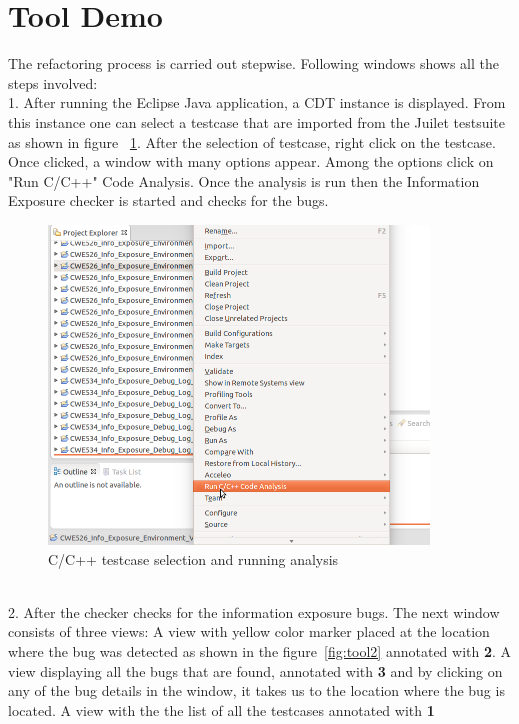 \section{Tool Demo}
\label{demo:behavior}
The refactoring process is carried out stepwise. Following windows shows all the steps involved:\\
1. After running the Eclipse Java application, a CDT instance is displayed. From this
instance one can select a testcase that are imported from the Juilet testsuite as shown in figure
~\ref{fig:tool1}.
After the selection of testcase, right click on the testcase. Once clicked,
a window with many options appear. Among the options click on "Run C/C++" Code Analysis.
Once the analysis is run then the Information Exposure checker is started and checks for
the bugs.\\
\begin{figure}[!htb]
\centering
\includegraphics[width=0.9\textwidth]{png/Tool1.png}
\caption{C/C++ testcase selection and running analysis}
\label{fig:tool1}
\end{figure}\\
2. After the checker checks for the information exposure bugs. The next window consists of three views: A view
with yellow color
marker placed at the location where the bug was detected as shown in the figure~\ref{fig:tool2} annotated 
with \textbf{2}. A view displaying all the bugs that are found, annotated with \textbf{3} and by clicking on 
any of the bug details in the window, it takes us to the location where the bug is located. A view with the the list
of all the testcases annotated with \textbf{1}\\
